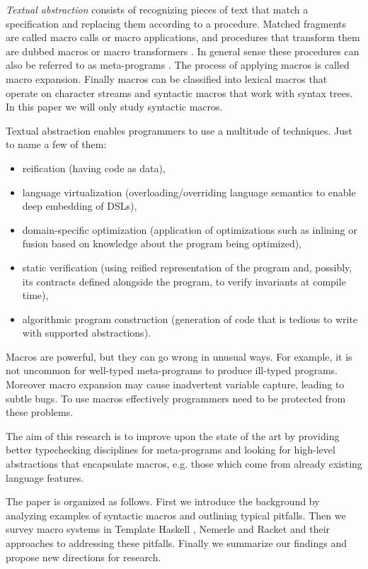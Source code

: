 \documentclass[10pt,journal,a4paper]{IEEEtran}
\begin{document}
\emph{Textual abstraction} consists of recognizing pieces of text
that match a specification and replacing them according
to a procedure.
Matched fragments are called macro calls or macro applications, and
procedures that transform them are dubbed macros or macro transformers \cite{kohlbecker86}.
In general sense these procedures can also be referred to as meta-programs \cite{sheard01}.
The process of applying macros is called macro expansion.
Finally macros can be classified into lexical macros that
operate on character streams and syntactic macros that work with syntax trees.
In this paper we will only study syntactic macros.

Textual abstraction enables programmers to use a multitude of techniques.
Just to name a few of them:
\begin{itemize}
\item reification (having code as data),
\item language virtualization (overloading/overriding language semantics
to enable deep embedding of DSLs),
\item domain-specific optimization (application of optimizations such as inlining
or fusion based on knowledge about the program being optimized),
\item static verification (using reified representation of the program
and, possibly, its contracts defined alongside the program, to verify invariants
at compile time),
\item algorithmic program construction (generation of code that is tedious to write with
supported abstractions).
\end{itemize}

Macros are powerful, but they can go wrong in unusual ways.
For example, it is not uncommon for well-typed meta-programs to produce ill-typed programs.
Moreover macro expansion may cause inadvertent variable capture, leading to
subtle bugs. To use macros effectively programmers need to be protected from these problems.

The aim of this research is to improve upon the state of the art by providing better typechecking
disciplines for meta-programs and looking for high-level abstractions that encapsulate macros,
e.g. those which come from already existing language features.

The paper is organized as follows. First we introduce the background by analyzing examples
of syntactic macros and outlining typical pitfalls. Then we survey
macro systems in Template Haskell \cite{sheard02}, Nemerle \cite{skalski04} and Racket \cite{barzilay11}
and their approaches to addressing these pitfalls. Finally we summarize our findings
and propose new directions for research.
\end{document}
